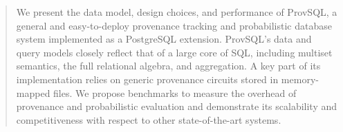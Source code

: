 \begin{abstract}
	We present the data model, design choices, and performance of
	ProvSQL, a general and easy-to-deploy provenance tracking and
	probabilistic database system implemented as a PostgreSQL extension.
	ProvSQL's data and query models closely reflect that of a large core of
	SQL, including multiset semantics, the full relational algebra, and
	aggregation. A key part of its implementation relies on generic
	provenance circuits stored in memory-mapped files. We propose
	benchmarks to measure the overhead of provenance and probabilistic
	evaluation and demonstrate its scalability and
	competitiveness with respect to other state-of-the-art systems.
\end{abstract}
